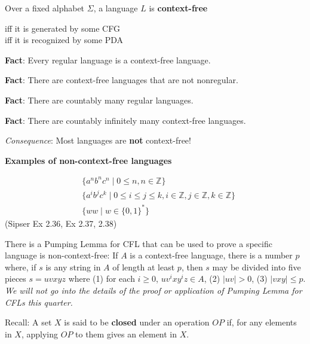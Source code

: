 \documentclass[12pt, oneside]{article}
\begin{document}
Over a fixed alphabet $\Sigma$, a language $L$ is {\bf context-free}

\vspace{-20pt}
\begin{center}
    iff it is generated by some CFG\\
    iff it is recognized by some PDA
\end{center}

\vfill

{\bf Fact}: Every regular language is a context-free language.

\vfill

{\bf Fact}: There are context-free languages that are not nonregular.

\vfill

{\bf Fact}: There are countably many regular languages.

\vfill

{\bf Fact}: There are countably infinitely many context-free languages.

\vfill

{\it Consequence}: Most languages are {\bf not} context-free!

\vfill

\newpage
{\bf Examples  of non-context-free languages}

\begin{align*}
    &\{ a^n b^n c^n \mid 0 \leq n , n \in \mathbb{Z}\}\\
    &\{ a^i b^j c^k \mid 0 \leq i \leq j \leq k , i \in \mathbb{Z}, j \in \mathbb{Z}, k \in \mathbb{Z}\}\\
    &\{ ww \mid w \in \{0,1\}^* \}
\end{align*}
(Sipser Ex 2.36, Ex 2.37, 2.38)

There is a Pumping Lemma for CFL that can be used to prove a specific language is non-context-free: 
If $A$ is a context-free language, there
is a number $p$ where, if $s$ is any string in $A$ of length at least $p$, then $s$ may be divided 
into five pieces $s = uvxyz$ where (1) for each $i \geq 0$, $uv^ixy^iz \in A$, (2) $|uv|>0$, (3) $|vxy| \leq p$.
{\it We will not go into the details of the proof or application of Pumping Lemma for CFLs this quarter.}


Recall: A set $X$ is said to be {\bf closed} under an operation $OP$ if, for any elements in $X$, applying 
$OP$ to them gives an element in $X$.  
\end{document}
